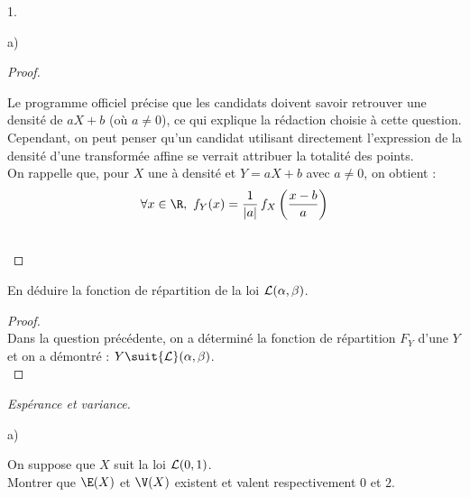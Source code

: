 \begin{noliste}{1.}
\begin{noliste}{a)}
\begin{proof}
        
    \begin{remark}
      Le programme officiel précise que les candidats doivent savoir
      retrouver une densité de $aX+b$ (où $a \neq 0$), ce qui 
      explique la rédaction choisie à cette question.\\
      Cependant, on peut penser qu'un candidat utilisant directement
      l'expression de la densité d'une transformée affine se verrait 
      attribuer la totalité des points.\\
      On rappelle que, pour $X$ une \var à densité et $Y=aX+b$ avec
      $a \neq 0$, on obtient :
      \[
        \forall x \in \R, \ f_Y(x) = \dfrac{1}{\vert a \vert} \, 
        f_X\left( \dfrac{x-b}{a}\right)
      \]
    \end{remark}~\\[-1.4cm]
  \end{proof}
  
  
  
  \newpage
  
  
  
\item En déduire la fonction de répartition de la loi ${\cal
    L}(\alpha,\beta)$.
  
  \begin{proof}~\\%
    Dans la question précédente, on a déterminé la fonction de
    répartition $F_Y$ d'une \var $Y$ et on a démontré : $Y \suit {\cal
      L}(\alpha, \beta)$.%
    ~\\[-1cm]
  \end{proof}
\end{noliste}

\item {\em Espérance et variance.}
  \begin{noliste}{a)}
  \setlength{\itemsep}{2mm} %
  \item On suppose que $X$ suit la loi ${\cal L}(0,1)$.\\
    Montrer que $\E(X)$ et $\V(X)$ existent et valent respectivement
    $0$ et $2$.


\end{noliste}
\end{noliste}
